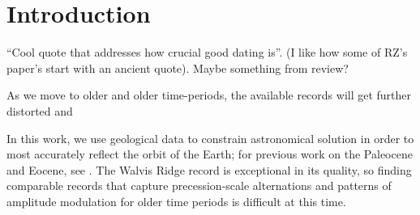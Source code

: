 \documentclass[draft]{agujournal2019}
\begin{document}
%
%
%
%





\section{Introduction}\label{sec:intro}

``Cool quote that addresses how crucial good dating is''.
(I like how some of RZ's paper's start with an ancient quote).
Maybe something from  review?

As we move to older and older time-periods, the available records will get further distorted and

In this work, we use geological data to constrain astronomical solution in order to most accurately reflect the orbit of the Earth; for previous work on the Paleocene and Eocene, see .
The Walvis Ridge record is exceptional in its quality, so finding comparable records that capture precession-scale alternations and patterns of amplitude modulation for older time periods is difficult at this time.
\end{document}
